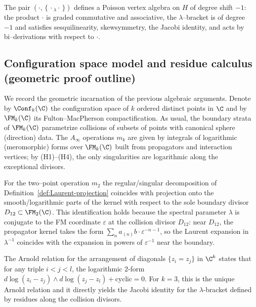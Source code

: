 \begin{corollary}%
The pair $(\cdot,\,\{\,\cdot {}_\lambda \cdot\,\})$ defines a Poisson vertex algebra on $H$ of degree shift $-1$: the product $\cdot$ is graded commutative and associative, the $\lambda$–bracket is of degree $-1$ and satisfies sesquilinearity, skewsymmetry, the Jacobi identity, and acts by bi–derivations with respect to $\cdot$.
\end{corollary}

\subsection{Configuration space model and residue calculus (geometric proof outline)}

We record the geometric incarnation of the previous algebraic arguments. Denote by $\Conf_k(\C)$ the configuration space of $k$ ordered distinct points in $\C$ and by $\FM_k(\C)$ its Fulton–MacPherson compactification. As usual, the boundary strata of $\FM_k(\C)$ parametrize collisions of subsets of points with canonical sphere (direction) data. The $A_\infty$ operations $m_k$ are given by integrals of logarithmic (meromorphic) forms over $\FM_k(\C)$ built from propagators and interaction vertices; by (H1)–(H4), the only singularities are logarithmic along the exceptional divisors.

\begin{definition}%
For the two–point operation $m_2$ the regular/singular decomposition of Definition~\ref{def:Laurent-projection} coincides with projection onto the smooth/logarithmic parts of the kernel with respect to the sole boundary divisor $D_{12}\subset \FM_2(\C)$. This identification holds because the spectral parameter $\lambda$ is conjugate to the FM coordinate $\varepsilon$ at the collision divisor $D_{12}$: near $D_{12}$, the propagator kernel takes the form $\sum_n a_{(n)}b \cdot \varepsilon^{-n-1}$, so the Laurent expansion in $\lambda^{-1}$ coincides with the expansion in powers of $\varepsilon^{-1}$ near the boundary.
\end{definition}

\begin{proposition}%
The Arnold relation for the arrangement of diagonals $\{z_i = z_j\}$ in $\C^k$ states that for any triple $i<j<l$, the logarithmic 2-form $d\log(z_i - z_j) \wedge d\log(z_j - z_l) + \text{cyclic} = 0$. For $k=3$, this is the unique Arnold relation and it directly yields the Jacobi identity for the $\lambda$-bracket defined by residues along the collision divisors.
\end{proposition}

